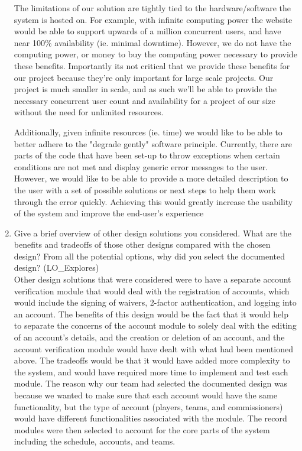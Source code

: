 \documentclass[12pt, titlepage]{article}
\begin{document}
\begin{enumerate}
    The limitations of our solution are tightly tied to the hardware/software 
    the system is hosted on. For example, with infinite computing power the 
    website would be able to support upwards of a million concurrent users, 
    and have near 100\% availability (ie. minimal downtime). However, we do not
    have the computing power, or money to buy the computing power necessary to
    provide these benefits. Importantly its not critical that we provide these
    benefits for our project because they're only important for large scale
    projects. Our project is much smaller in scale, and as such we'll be able 
    to provide the necessary concurrent user count and availability for a 
    project of our size without the need for unlimited resources.

    Additionally, given infinite resources (ie. time) we would like to be able to
    better adhere to the "degrade gently" software principle. Currently, there are 
    parts of the code that have been set-up to throw exceptions when certain
    conditions are not met and display generic error messages to the user. 
    However, we would like to be able to provide a more detailed description to the 
    user with a set of possible solutions or next steps to help them work through 
    the error quickly. Achieving this would greatly increase the usability of the
    system and improve the end-user's experience
    
    
    \item Give a brief overview of other design solutions you considered. What
    are the benefits and tradeoffs of those other designs compared with the chosen
    design?  From all the potential options, why did you select the documented design?
    (LO\_Explores)\\

    Other design solutions that were considered were to have a separate account verification module
    that would deal with the registration of accounts, which would include the signing of waivers,
    2-factor authentication, and logging into an account. The benefits of this design would be the
    fact that it would help to separate the concerns of the account module to solely deal with the
    editing of an account's details, and the creation or deletion of an account, and the account
    verification module would have dealt with what had been mentioned above. The tradeoffs would
    be that it would have added more complexity to the system, and would have required more time
    to implement and test each module. The reason why our team had selected the documented design
    was because we wanted to make sure that each account would have the same functionality, but
    the type of account (players, teams, and commissioners) would have different functionalities
    associated with the module. The record modules were then selected to account for the
    core parts of the system including the schedule, accounts, and teams.



\end{enumerate}
\end{document}
